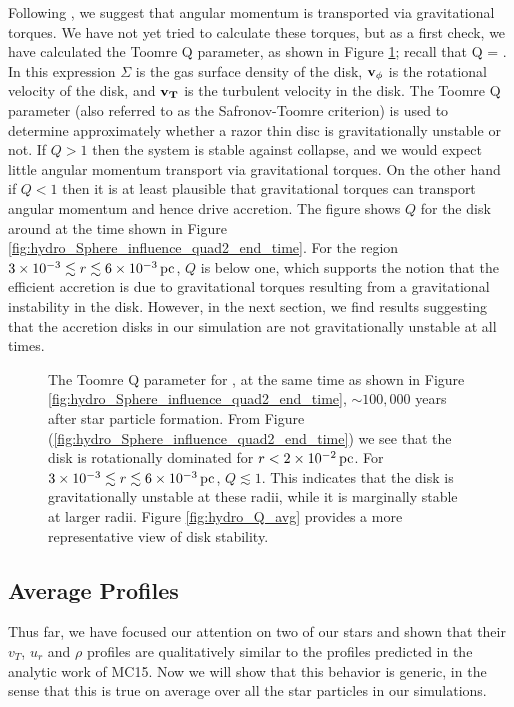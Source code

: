 \documentclass[../dissertation.tex]{subfiles}
\begin{document}
Following \citet{2010ApJ...708.1585K}, we suggest that angular momentum is transported via gravitational torques. We have not yet
tried to calculate these torques, but as a first check, we have calculated the 
Toomre Q parameter, as shown in Figure \ref{fig:hydro_Toomre_Q_2B}; recall that 
%
\be 
Q = .
\label{eq:hydro_Toomre_Q}
\ee
%
In this expression $\Sigma$ is the gas surface density of the disk, $\mathbf{v_\phi}$ is the rotational velocity of the disk, and $\mathbf{v_T}$ is the turbulent velocity in the disk. 
The Toomre Q parameter (also referred to as the Safronov-Toomre criterion) is used to determine approximately whether a razor thin disc is gravitationally unstable or not. 
If $Q > 1$ then the system is stable against collapse, and we would expect little angular momentum transport via gravitational torques. 
On the other hand if $Q < 1$ then it is at least plausible that gravitational torques can transport angular momentum and hence drive accretion.
The figure shows $Q$ for the disk around \partB at the time shown in Figure
\ref{fig:hydro_Sphere_influence_quad2_end_time}.
For the region $3\times10^{-3} \lesssim r \lesssim 6\times10^{-3} \,\rm pc$, $Q$ 
is below one, which supports the notion that the efficient accretion 
is due to gravitational torques resulting from a gravitational instability 
in the disk. However, in the next section, we find results suggesting that
the accretion disks in our simulation are not gravitationally unstable at all
times.
%
\begin{figure}[htb] %
\caption[Hydro Toomre Q]{\label{fig:hydro_Toomre_Q_2B}The Toomre Q parameter for \partB, at the same time as shown in
Figure \ref{fig:hydro_Sphere_influence_quad2_end_time}, $\sim 100,000$ years 
after star particle formation. From Figure 
(\ref{fig:hydro_Sphere_influence_quad2_end_time}) we see that the disk is rotationally
dominated for $r<2\times10^{-2}\,\rm pc$. 
For $3\times10^{-3} \lesssim r \lesssim 6\times10^{-3} \,\rm pc$, $Q\lesssim 1$. 
This indicates that the disk is gravitationally unstable at these radii, 
while it is marginally stable at larger radii.
Figure \ref{fig:hydro_Q_avg} provides a more representative view of disk stability.}
\end{figure}

\subsection{Average Profiles}\label{sec:hydro_ average profiles}
Thus far, we have focused our attention on two of our stars and shown
that their $v_T$, $u_r$ and $\rho$ profiles are qualitatively similar
to the profiles predicted in the analytic work of MC15. Now we will
show that this behavior is generic, in the sense that this is true on
average over all the star particles in our simulations.
\end{document}
